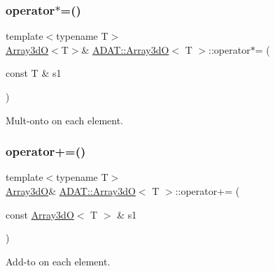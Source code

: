 \subsubsection{\texorpdfstring{operator$\ast$=()}{operator*=()}\hspace{0.1cm}{\footnotesize\ttfamily [4/4]}}
{\footnotesize\ttfamily template$<$typename T$>$ \\
\mbox{\hyperlink{classADAT_1_1Array3dO}{Array3dO}}$<$T$>$\& \mbox{\hyperlink{classADAT_1_1Array3dO}{A\+D\+A\+T\+::\+Array3dO}}$<$ T $>$\+::operator$\ast$= (\begin{DoxyParamCaption}\item[{const T \&}]{s1 }\end{DoxyParamCaption})\hspace{0.3cm}{\ttfamily [inline]}}



Mult-\/onto on each element. 

\mbox{\label{classADAT_1_1Array3dO_a5d72c8e7dd54897fe898b07616123229}} 
\subsubsection{\texorpdfstring{operator+=()}{operator+=()}\hspace{0.1cm}{\footnotesize\ttfamily [1/4]}}
{\footnotesize\ttfamily template$<$typename T$>$ \\
\mbox{\hyperlink{classADAT_1_1Array3dO}{Array3dO}}\& \mbox{\hyperlink{classADAT_1_1Array3dO}{A\+D\+A\+T\+::\+Array3dO}}$<$ T $>$\+::operator+= (\begin{DoxyParamCaption}\item[{const \mbox{\hyperlink{classADAT_1_1Array3dO}{Array3dO}}$<$ T $>$ \&}]{s1 }\end{DoxyParamCaption})\hspace{0.3cm}{\ttfamily [inline]}}



Add-\/to on each element. 

\mbox{\label{classADAT_1_1Array3dO_a5d72c8e7dd54897fe898b07616123229}} 
